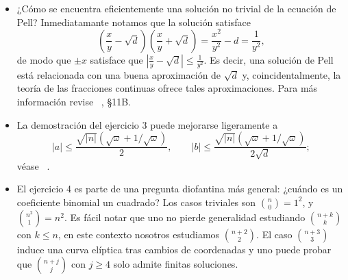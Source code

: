 \documentclass[11pt, reqno]{amsart}
\begin{document}
\begin{itemize}
	\item ¿Cómo se encuentra eficientemente una solución no trivial de la ecuación de Pell?
		Inmediatamante notamos que la solución satisface
		\[
			\left( \frac{x}{y} - \sqrt{d} \right)\left( \frac{x}{y} + \sqrt{d} \right) = \frac{x^2}{y^2} - d = \frac{1}{y^2},
		\]
		de modo que $\pm x$ satisface que $\left| \frac{x}{y} - \sqrt{d} \right| \le \frac{1}{y^2}$.
		Es decir, una solución de Pell está relacionada con una buena aproximación de $\sqrt{d}$ y, coincidentalmente, la teoría de las fracciones continuas
		ofrece tales aproximaciones.
		Para más información revise \citeauthor{granville:masterclass}~\cite[427-435]{granville:masterclass}, \S11B.

	\item La demostración del ejercicio 3 puede mejorarse ligeramente a
		$$ |a| \le \frac{ \sqrt{|n|}(\sqrt{\omega} + 1/\sqrt{\omega})}{2}, \qquad |b| \le \frac{ \sqrt{|n|}(\sqrt{\omega} + 1/\sqrt{\omega})}{2\sqrt{d}}; $$
		véase \citeauthor{conrad:pell}~\cite{conrad:pell}.

	\item El ejercicio 4 es parte de una pregunta diofantina más general: ¿cuándo es un coeficiente binomial un cuadrado?
		Los casos triviales son $\binom{n}{0} = 1^2$, y $\binom{n^2}{1} = n^2$.
		Es fácil notar que uno no pierde generalidad estudiando $\binom{n + k}{k}$ con $k \le n$, en este contexto nosotros estudiamos $\binom{n + 2}{2}$.
		El caso $\binom{n + 3}{3}$ induce una curva elíptica tras cambios de coordenadas y uno puede probar que $\binom{n + j}{j}$ con $j \ge 4$
		solo admite finitas soluciones.
\end{itemize}

\nocite{granville:masterclass}
\printbibliography[title={Referencias y lecturas adicionales}]
\end{document}
